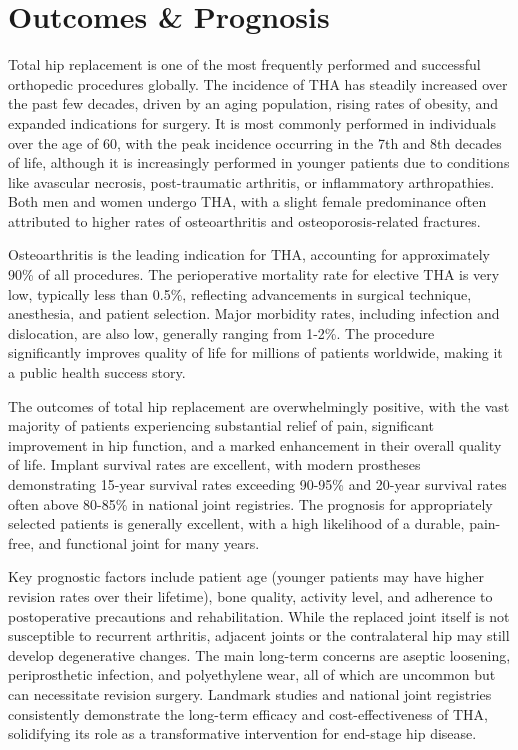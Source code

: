 \section*{Outcomes \& Prognosis}
Total hip replacement is one of the most frequently performed and successful orthopedic procedures globally. The incidence of THA has steadily increased over the past few decades, driven by an aging population, rising rates of obesity, and expanded indications for surgery. It is most commonly performed in individuals over the age of 60, with the peak incidence occurring in the 7th and 8th decades of life, although it is increasingly performed in younger patients due to conditions like avascular necrosis, post-traumatic arthritis, or inflammatory arthropathies. Both men and women undergo THA, with a slight female predominance often attributed to higher rates of osteoarthritis and osteoporosis-related fractures.

Osteoarthritis is the leading indication for THA, accounting for approximately 90\% of all procedures. The perioperative mortality rate for elective THA is very low, typically less than 0.5\%, reflecting advancements in surgical technique, anesthesia, and patient selection. Major morbidity rates, including infection and dislocation, are also low, generally ranging from 1-2\%. The procedure significantly improves quality of life for millions of patients worldwide, making it a public health success story.

The outcomes of total hip replacement are overwhelmingly positive, with the vast majority of patients experiencing substantial relief of pain, significant improvement in hip function, and a marked enhancement in their overall quality of life. Implant survival rates are excellent, with modern prostheses demonstrating 15-year survival rates exceeding 90-95\% and 20-year survival rates often above 80-85\% in national joint registries. The prognosis for appropriately selected patients is generally excellent, with a high likelihood of a durable, pain-free, and functional joint for many years.

Key prognostic factors include patient age (younger patients may have higher revision rates over their lifetime), bone quality, activity level, and adherence to postoperative precautions and rehabilitation. While the replaced joint itself is not susceptible to recurrent arthritis, adjacent joints or the contralateral hip may still develop degenerative changes. The main long-term concerns are aseptic loosening, periprosthetic infection, and polyethylene wear, all of which are uncommon but can necessitate revision surgery. Landmark studies and national joint registries consistently demonstrate the long-term efficacy and cost-effectiveness of THA, solidifying its role as a transformative intervention for end-stage hip disease.

